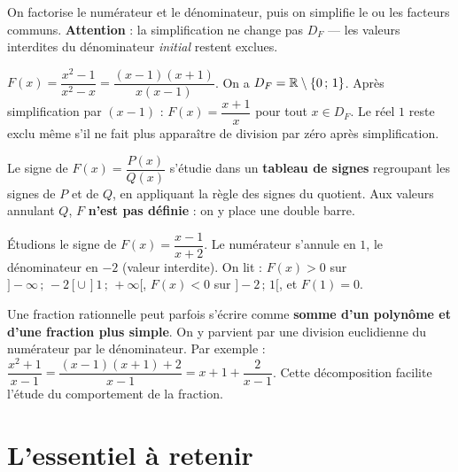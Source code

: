 \begin{aretenir}
On factorise le numérateur et le dénominateur, puis on simplifie le ou les facteurs
communs. \textbf{Attention} : la simplification ne change pas $D_F$ — les valeurs
interdites du dénominateur \emph{initial} restent exclues.
\end{aretenir}

\begin{exemple}
$F(x)=\dfrac{x^2-1}{x^2-x}=\dfrac{(x-1)(x+1)}{x(x-1)}$. On a $D_F=\mathbb{R}\setminus\{0\,;\,1\}$.
Après simplification par $(x-1)$ : $F(x)=\dfrac{x+1}{x}$ pour tout $x\in D_F$. Le réel
$1$ reste exclu même s'il ne fait plus apparaître de division par zéro après simplification.
\end{exemple}

\begin{propriete}
Le signe de $F(x)=\dfrac{P(x)}{Q(x)}$ s'étudie dans un \textbf{tableau de signes}
regroupant les signes de $P$ et de $Q$, en appliquant la règle des signes du quotient.
Aux valeurs annulant $Q$, $F$ \textbf{n'est pas définie} : on y place une double barre.
\end{propriete}

\begin{exemple}
Étudions le signe de $F(x)=\dfrac{x-1}{x+2}$. Le numérateur s'annule en $1$, le
dénominateur en $-2$ (valeur interdite). On lit : $F(x)>0$ sur
$]-\infty\,;\,-2[\cup\,]1\,;\,+\infty[$, $F(x)<0$ sur $]-2\,;\,1[$, et $F(1)=0$.
\end{exemple}

\begin{remarque}
Une fraction rationnelle peut parfois s'écrire comme \textbf{somme d'un polynôme et
d'une fraction plus simple}. On y parvient par une division euclidienne du numérateur par
le dénominateur. Par exemple :
$\dfrac{x^2+1}{x-1}=\dfrac{(x-1)(x+1)+2}{x-1}=x+1+\dfrac{2}{x-1}$.
Cette décomposition facilite l'étude du comportement de la fraction.
\end{remarque}

\section{L'essentiel à retenir}

